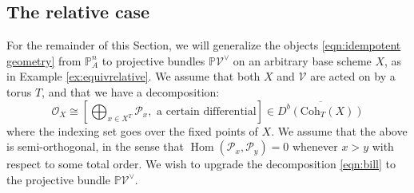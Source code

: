 \documentclass[12pt]{amsart}
\numberwithin{equation}{section}
\theoremstyle{definition}
\theoremstyle{remark}
\DeclareMathOperator{\Hom}{Hom}
\newcommand{\CC}{\mathbb{C}}
\newcommand{\PP}{\mathbb{P}}
\renewcommand{\CD}{\mathcal{D}}
\newcommand{\bCD}{\overline{\CD}}
\newcommand{\CO}{\mathcal{O}}
\newcommand{\CP}{\mathcal{P}}
\newcommand{\CV}{\mathcal{V}}
\renewcommand{\1}{\mathbf{1}}
\newcommand{\coh}{\mathrm{Coh}}
\begin{document}


\subsection{The relative case}

For the remainder of this Section, we will generalize the objects \eqref{eqn:idempotent geometry} from $\PP^n_A$ to projective bundles $\PP \CV^\vee$ on an arbitrary base scheme $X$, as in Example \ref{ex:equivrelative}. We assume that both $X$ and $\CV$ are acted on by a torus $T$, and that we have a decomposition:
\begin{equation}
\label{eqn:bill}
\CO_X \cong \left[ \bigoplus_{x\in X^T} \CP_x, \text{ a certain differential}\right] \in \overline{D^b(\coh_T(X))}
\end{equation}
where the indexing set goes over the fixed points of $X$. We assume that the above is semi-orthogonal, in the sense that $\Hom(\CP_x, \CP_y) = 0$ whenever $x>y$ with respect to some total order. We wish to upgrade the decomposition \eqref{eqn:bill} to the projective bundle $\PP \CV^{\vee}$. 
\end{document}
